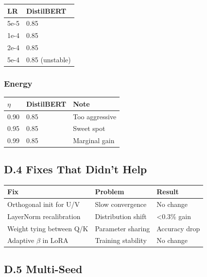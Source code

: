 \begin{table}[H]
\centering
\small
\begin{tabular}{ll}
\toprule
\textbf{LR} & \textbf{DistilBERT} \\
\midrule
5e-5 & 0.85 \\
1e-4 & 0.85 \\
2e-4 & 0.85 \\
5e-4 & 0.85 (unstable) \\
\bottomrule
\end{tabular}
\end{table}

\subsubsection{Energy}

\begin{table}[H]
\centering
\small
\begin{tabular}{lll}
\toprule
\textbf{$\eta$} & \textbf{DistilBERT} & \textbf{Note} \\
\midrule
0.90 & 0.85 & Too aggressive \\
0.95 & 0.85 & Sweet spot \\
0.99 & 0.85 & Marginal gain \\
\bottomrule
\end{tabular}
\end{table}

\subsection{D.4 Fixes That Didn't Help}

\begin{table}[H]
\centering
\small
\begin{tabular}{lll}
\toprule
\textbf{Fix} & \textbf{Problem} & \textbf{Result} \\
\midrule
Orthogonal init for U/V & Slow convergence & No change \\
LayerNorm recalibration & Distribution shift & <0.3\% gain \\
Weight tying between Q/K & Parameter sharing & Accuracy drop \\
Adaptive $\beta$ in LoRA & Training stability & No change \\
\bottomrule
\end{tabular}
\end{table}

\subsection{D.5 Multi-Seed}

